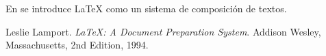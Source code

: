 \documentclass{article}
\begin{document}
En \cite{lamport94} se introduce LaTeX como un sistema de composición de textos.

\begin{thebibliography}{9}
Leslie Lamport.
\textit{LaTeX: A Document Preparation System}.
Addison Wesley, Massachusetts, 2nd Edition, 1994.
\end{thebibliography}
\end{document}
